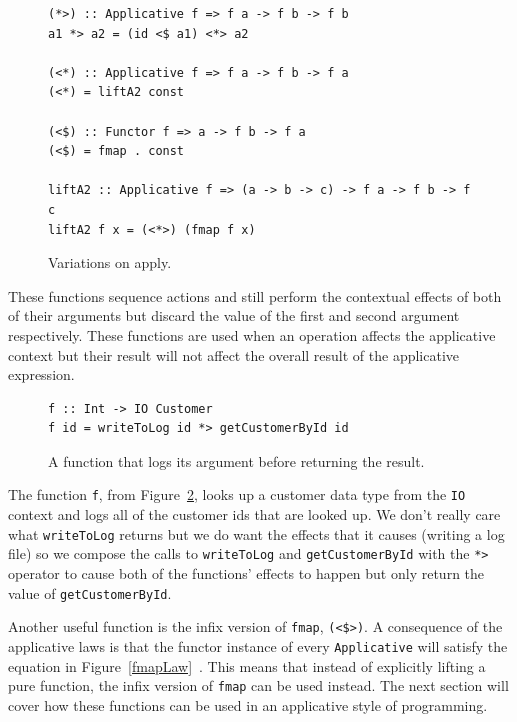 \begin{figure}[t]
\begin{lstlisting}
(*>) :: Applicative f => f a -> f b -> f b
a1 *> a2 = (id <$ a1) <*> a2

(<*) :: Applicative f => f a -> f b -> f a
(<*) = liftA2 const

(<$) :: Functor f => a -> f b -> f a
(<$) = fmap . const

liftA2 :: Applicative f => (a -> b -> c) -> f a -> f b -> f c
liftA2 f x = (<*>) (fmap f x)

\end{lstlisting}
\caption{Variations on apply.}
\label{appVars}
\end{figure}

These functions sequence actions and still perform the contextual effects of both of their arguments but discard the value of the first and second argument respectively. These functions are used when an operation affects the applicative context but their result will not affect the overall result of the applicative expression. 

\begin{figure}[t]
\begin{lstlisting}
f :: Int -> IO Customer
f id = writeToLog id *> getCustomerById id
\end{lstlisting}
\caption{A function that logs its argument before returning the result.}
\label{logApp}
\end{figure}

The function \texttt{f}, from Figure~\ref{logApp}, looks up a customer data type from the \texttt{IO} context and logs all of the customer ids that are looked up. We don't really care what \texttt{writeToLog} returns but we do want the effects that it causes (writing a log file) so we compose the calls to \texttt{writeToLog} and \texttt{getCustomerById} with the \texttt{*>} operator to cause both of the functions' effects to happen but only return the value of \texttt{getCustomerById}.

Another useful function is the infix version of \texttt{fmap}, \texttt{(<\$>)}. A consequence of the applicative laws is that the functor instance of every \texttt{Applicative} will satisfy the equation in  Figure~\ref{fmapLaw}~\citep{control.applicative}. This means that instead of explicitly lifting a pure function, the infix version of \texttt{fmap} can be used instead. The next section will cover how these functions can be used in an applicative style of programming.

